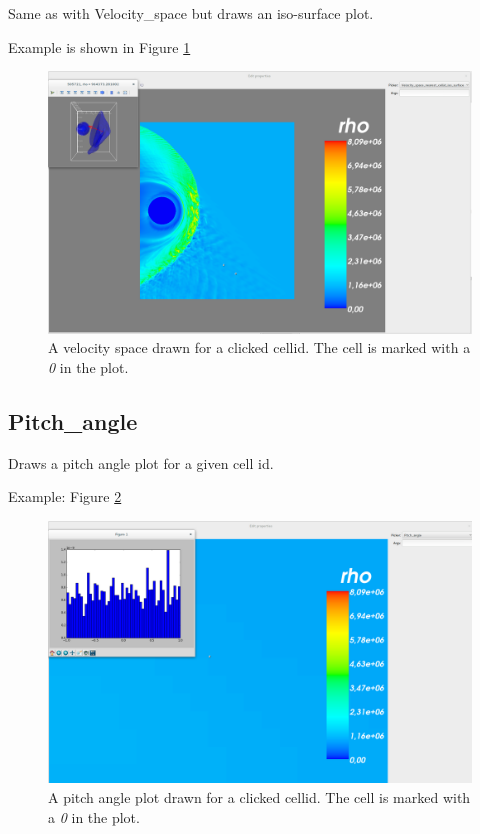 \documentclass[a4paper,10pt]{article}
\begin{document}
Same as with Velocity\_space but draws an iso-surface plot.

Example is shown in Figure \ref{fig:vel_space2}

\begin{figure}[H]
 \centering
 \includegraphics[width=\textwidth]{../../images/velocity_space_nearest_cellid_iso_surface.png}
 \caption{A velocity space drawn for a clicked cellid. The cell is marked with a \emph{0} in the plot.}
 \label{fig:vel_space2}
\end{figure}

\subsection{Pitch\_angle}

Draws a pitch angle plot for a given cell id.

Example: Figure \ref{fig:pitch_angle}

\begin{figure}[H]
 \centering
 \includegraphics[width=\textwidth]{../../images/pitch_angle.png}
 \caption{A pitch angle plot drawn for a clicked cellid. The cell is marked with a \emph{0} in the plot.}
 \label{fig:pitch_angle}
\end{figure}
\end{document}
